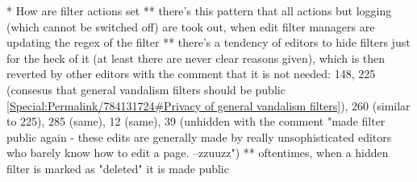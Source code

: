 \begin{comment}
Edit filter managers often introduce filters based on some phenomena they have observed caught by other filters, other algorithmic quality control mechanisms or general experience.
As all newly implemented filters, these are initially enabled in logging only mode until enough log entries are generated to evaluate whether the incident is severe and frequent enough to need a filter.


Quite some of the 154 edit filter managers have a kind of "not active at the moment" banner on their user page.
How many new editors have gotten the permission in recent time?
Otherwise the group is apparently aging..


CAT: https://ca.wikipedia.org/wiki/Especial:Usuaris/abusefilter (currently: 4 users)

-- auf Spanisch/Deutsch/Russisch existiert die Rolle nicht; interessant zu wissen, ob sie iwo subsumiert wurde
-- auf Bulgarisch übrigens auch nicht, aber da existiert auch die gesamte EditFilter seite nicht
Probably it's simply admins who can modify the filters there.

\subsection{Modifying a filter}
It is not uncommon, that the action(s) a particular filter triggers change over time.
As of the guidelines for implementing new filters, every filter should be enabled in ``log only'' mode at its introduction.
After it has been deemed that the filter actually acts as desired, usually additional actions are switched on~\cite{Wikipedia:EditFilterInstructions}.
Sometimes, when a wave of particularly persistent vandalism arises, a filter is temporarily set to ``warn'' or ``disallow'' and the actions are removed again as soon as the filter is not tripped very frequently anymore. %

\end{comment}

* How are filter actions set
  ** there's this pattern that all actions but logging (which cannot be switched off) are took out, when edit filter managers are updating the regex of the filter
  ** there's a tendency of editors to hide filters just for the heck of it (at least there are never clear reasons given), which is then reverted by other editors with the comment that it is not needed: 148, 225 (consesus that general vandalism filters should be public \url{[Special:Permalink/784131724#Privacy of general vandalism filters]}), 260 (similar to 225), 285 (same), 12 (same), 39 (unhidden with the comment "made filter public again - these edits are generally made by really unsophisticated editors who barely know how to edit a page. --zzuuzz")
  ** oftentimes, when a hidden filter is marked as "deleted" it is made public


